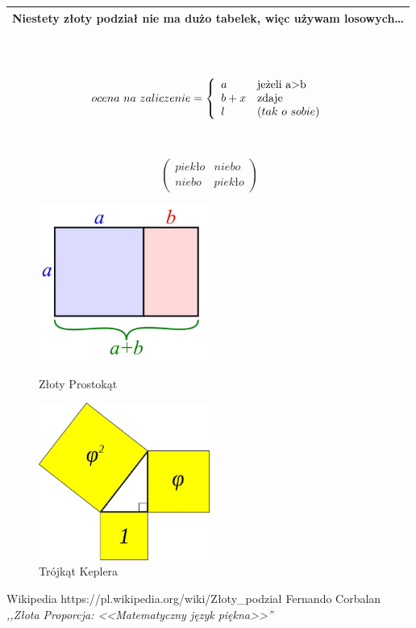 \documentclass{article}
\begin{document}
\newpage
\begin{tabular}{|p{11cm}|} \hline
Niestety złoty podział nie ma dużo tabelek, więc używam losowych\ldots\\ \hline
\end{tabular}
\\\\
\begin{displaymath}
ocena~na~zaliczenie = \left\{ \begin{array}{ll}
a & \textrm{jeżeli a>b}\\
b+x & \textrm{zdaje}\\
l & \textrm(tak~o~sobie)
\end{array} \right.
\end{displaymath}
\\\\
\begin{displaymath}
\left(\begin{array}{c|c}
piekło & niebo \\ \hline
niebo & piekło
\end{array}\right)
\end{displaymath}
\newpage
\begin{figure}
\centering
\includegraphics[width=0.5\textwidth, height=0.4\textheight]{grafika/prostokat.jpg}
\caption{Złoty Prostokąt}
\label{fig:prostokat}
\centering
\includegraphics[width=0.5\textwidth, height=0.4\textheight]{grafika/kepler.jpg}
\caption{Trójkąt Keplera}
\label{fig:kepler}
\end{figure}
\newpage
\begin{thebibliography}{99}
 Wikipedia
https://pl.wikipedia.org/wiki/Złoty\_podział
 Fernando Corbalan
\emph{,,Złota Proporcja: <<Matematyczny język piękna>>''}
\end{thebibliography}
\end{document}
